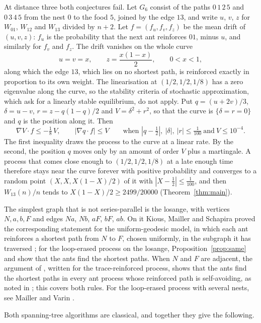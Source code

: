 \documentclass[11pt]{amsart}
\theoremstyle{remark}
\begin{document}
At distance three both conjectures fail. Let $G_6$ consist of the paths $0\,1\,2\,5$ and $0\,3\,4\,5$ from the nest $0$ to the food $5$, joined by the edge $13$, and write $u$, $v$, $z$ for $W_{01}$, $W_{12}$ and $W_{13}$ divided by $n+2$. Let $f=(f_u,f_v,f_z)$ be the mean drift of $(u,v,z)$: $f_u$ is the probability that the next ant reinforces $01$, minus $u$, and similarly for $f_v$ and $f_z$. The drift vanishes on the whole curve
\[
u=v=x,\qquad z=\frac{x(1-x)}2,\qquad 0<x<1,
\]
along which the edge $13$, which lies on no shortest path, is reinforced exactly in proportion to its own weight. The linearisation at $(1/2,1/2,1/8)$ has a zero eigenvalue along the curve, so the stability criteria of stochastic approximation, which ask for a linearly stable equilibrium, do not apply. Put $q=(u+2v)/3$, $\delta=u-v$, $r=z-q(1-q)/2$ and $V=\delta^2+r^2$, so that the curve is $\{\delta=r=0\}$ and $q$ is the position along it. Then
\[
\nabla V\cdot f\le-\tfrac18\,V,\qquad |\nabla q\cdot f|\le V\qquad\text{when } |q-\tfrac12|,\ |\delta|,\ |r|\le\tfrac1{100}\ \text{and}\ V\le10^{-4}.
\]
The first inequality draws the process to the curve at a linear rate. By the second, the position $q$ moves only by an amount of order $V$ plus a martingale. A process that comes close enough to $(1/2,1/2,1/8)$ at a late enough time therefore stays near the curve forever with positive probability and converges to a random point $(X,X,X(1-X)/2)$ of it with $|X-\tfrac12|\le\tfrac1{100}$, and then $W_{13}(n)/n$ tends to $X(1-X)/2\ge2499/20000$ (Theorem~\ref{thm:main}).

The simplest graph that is not series-parallel is the losange, with vertices $N,a,b,F$ and edges $Na$, $Nb$, $aF$, $bF$, $ab$. On it Kious, Mailler and Schapira proved the corresponding statement for the uniform-geodesic model, in which each ant reinforces a shortest path from $N$ to $F$, chosen uniformly, in the subgraph it has traversed \cite[Theorem~1.4]{KMS22a}; for the loop-erased process on the losange, Proposition~\ref{prop:same} and \cite[Theorem~1.1]{AM26} show that the ants find the shortest paths. When $N$ and $F$ are adjacent, the argument of \cite[Proposition~2.8]{KMS22b}, written for the trace-reinforced process, shows that the ants find the shortest paths in every ant process whose reinforced path is self-avoiding, as noted in \cite[Section~1]{AM26}; this covers both rules. For the loop-erased process with several nests, see Mailler and Varin \cite{MV26}.

Both spanning-tree algorithms are classical, and together they give the following.
\end{document}
